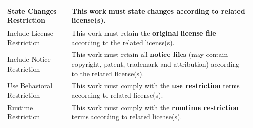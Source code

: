 \begin{table}[t]
\begin{tabular}{|p{3.3cm}|p{4.3cm}|}
    State Changes Restriction & This work must \textbf{state changes} according to related license(s). \\ \hline
    Include License Restriction & This work must retain the \textbf{original license file} according to the related license(s). \\ \hline
    Include Notice Restriction & This work must retain all \textbf{notice files} (may contain copyright, patent, trademark and attribution) according to the related license(s). \\ \hline
    Use Behavioral Restriction & This work must comply with the \textbf{use restriction} terms according to related license(s). \\ \hline
    Runtime Restriction & This work must comply with the \textbf{rumtime restriction} terms according to related license(s). \\ \hline

    \end{tabular}
\end{table}

